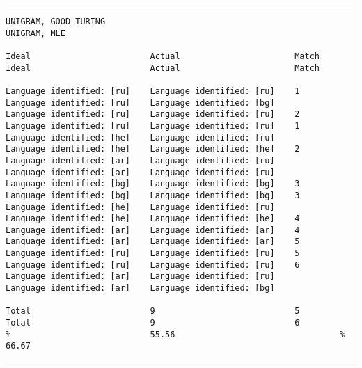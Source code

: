 \tiny
\hrule\vskip4pt
\begin{verbatim}
UNIGRAM, GOOD-TURING                                               UNIGRAM, MLE

Ideal                        Actual                       Match    Ideal                        Actual                       Match

Language identified: [ru]    Language identified: [ru]    1        Language identified: [ru]    Language identified: [bg]
Language identified: [ru]    Language identified: [ru]    2        Language identified: [ru]    Language identified: [ru]    1
Language identified: [he]    Language identified: [ru]             Language identified: [he]    Language identified: [he]    2
Language identified: [ar]    Language identified: [ru]             Language identified: [ar]    Language identified: [ru]
Language identified: [bg]    Language identified: [bg]    3        Language identified: [bg]    Language identified: [bg]    3
Language identified: [he]    Language identified: [ru]             Language identified: [he]    Language identified: [he]    4
Language identified: [ar]    Language identified: [ar]    4        Language identified: [ar]    Language identified: [ar]    5
Language identified: [ru]    Language identified: [ru]    5        Language identified: [ru]    Language identified: [ru]    6
Language identified: [ar]    Language identified: [ru]             Language identified: [ar]    Language identified: [bg]

Total                        9                            5        Total                        9                            6
%                            55.56                                 %                            66.67
\end{verbatim}
\vskip4pt\hrule


